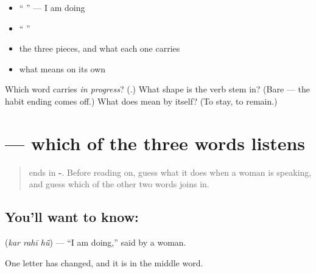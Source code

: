 \begin{itemize}
\raggedright
  \item \textquotedblleft{}  \textquotedblright{} — I am doing
  \item \textquotedblleft{}  \textquotedblright{}
  \item the three pieces, and what each one carries
  \item what  means on its own
\end{itemize}

\begin{tcolorbox}[breakable,colback=teal!4,colframe=teal!35!black,title={Before you move on}]
Which word carries \emph{in progress}? (\textbf{}.) What shape is the verb stem in? (Bare — the habit ending comes off.) What does \textbf{} mean by itself? (To stay, to remain.)
\end{tcolorbox}
\section[\texorpdfstring{\hi{कर} \hi{रही} \hi{हूँ} (kar rahī hū̃)}{कर रही हूँ (kar rahī hū̃)}]{   — which of the three words listens}

\label{lesson:HI-C89-kar-rahi-hun}



\begin{quote}
\textbf{} ends in \textbf{-}. Before reading on, guess what it does when a woman is speaking, and guess which of the other two words joins in.
\end{quote}

\subsection*{You'll want to know:   }
\textbf{  } (\emph{kar rahī hū̃}) — \textquotedblleft{}I am doing,\textquotedblright{} said by a woman.

One letter has changed, and it is in the middle word.

